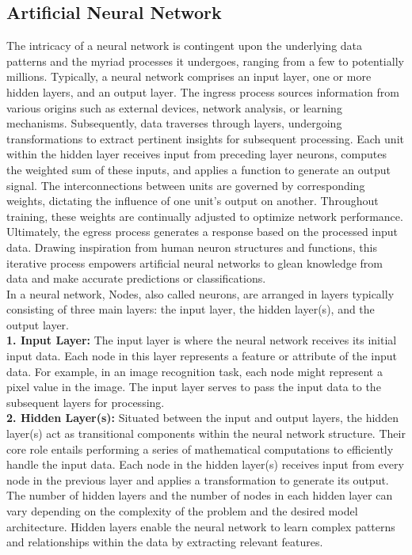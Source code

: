 \subsection{Artificial Neural Network}
The intricacy of a neural network is contingent upon the underlying data patterns and the myriad processes it undergoes, ranging from a few to potentially millions. Typically, a neural network comprises an input layer, one or more hidden layers, and an output layer. The ingress process sources information from various origins such as external devices, network analysis, or learning mechanisms. Subsequently, data traverses through layers, undergoing transformations to extract pertinent insights for subsequent processing. Each unit within the hidden layer receives input from preceding layer neurons, computes the weighted sum of these inputs, and applies a function to generate an output signal. The interconnections between units are governed by corresponding weights, dictating the influence of one unit's output on another. Throughout training, these weights are continually adjusted to optimize network performance. Ultimately, the egress process generates a response based on the processed input data. Drawing inspiration from human neuron structures and functions, this iterative process empowers artificial neural networks to glean knowledge from data and make accurate predictions or classifications.
\\
In a neural network, Nodes, also called neurons, are arranged in layers typically consisting of three main layers: the input layer, the hidden layer(s), and the output layer.
\\
\textbf{1. Input Layer:} The input layer is where the neural network receives its initial input data. Each node in this layer represents a feature or attribute of the input data. For example, in an image recognition task, each node might represent a pixel value in the image. The input layer serves to pass the input data to the subsequent layers for processing.
\\
\textbf{2. Hidden Layer(s):} Situated between the input and output layers, the hidden layer(s) act as transitional components within the neural network structure. Their core role entails performing a series of mathematical computations to efficiently handle the input data. Each node in the hidden layer(s) receives input from every node in the previous layer and applies a transformation to generate its output. The number of hidden layers and the number of nodes in each hidden layer can vary depending on the complexity of the problem and the desired model architecture. Hidden layers enable the neural network to learn complex patterns and relationships within the data by extracting relevant features.
